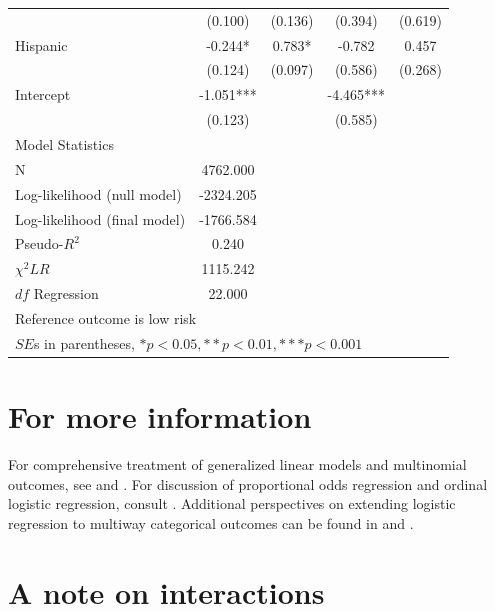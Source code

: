 \begin{table}[htbp]
\begin{tabular}{lcccc}
      &   (0.100)  &   (0.136)  &   (0.394)  &   (0.619)  \\
Hispanic     &   -0.244* &    0.783* &   -0.782  &    0.457  \\
      &   (0.124)  &   (0.097)  &   (0.586)  &   (0.268)  \\
Intercept    &   -1.051***&    &   -4.465***&    \\
      &   (0.123)  &    &   (0.585)  &   \\
\hline
\multicolumn{4}{l}{Model Statistics} \\
\hline
N      &  4762.000   \\
Log-likelihood (null model)    &  -2324.205   \\
Log-likelihood (final model)     & -1766.584   \\
Pseudo-$R^2$    &    0.240 \\
$\chi^2 LR$    &   1115.242  &     \\
$df$ Regression    &   22.000  &      \\
\hline
\multicolumn{4}{l}{Reference outcome is low risk} \\
\multicolumn{4}{l}{$SE$s in parentheses, $*p<0.05, **p<0.01, ***p<0.001$} \\
\hline
\end{tabular}
\end{table}

\section*{For more information}
For comprehensive treatment of generalized linear models and multinomial outcomes, see \citep{glm} and \citep{agresti}. For discussion of proportional odds regression and ordinal logistic regression, consult \citep{fox}. Additional perspectives on extending logistic regression to multiway categorical outcomes can be found in \citep{cameron2005microeconometrics} and \citep{eliason1993maximum}.\section{A note on interactions}
